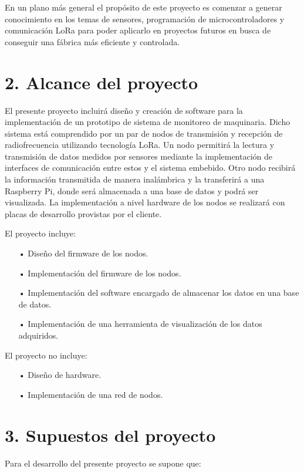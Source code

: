 \documentclass[11pt]{charter}
\begin{document}
En un plano más general el propósito de este proyecto es comenzar a generar conocimiento en los temas de sensores, programación de microcontroladores y comunicación LoRa para poder aplicarlo en proyectos futuros en busca de conseguir una fábrica más eficiente y controlada.

\section{2. Alcance del proyecto}
\label{sec:alcance}

El presente proyecto incluirá diseño y creación de software para la implementación de un prototipo de sistema de monitoreo de maquinaria. Dicho sistema está comprendido por un par de nodos de transmisión y recepción de radiofrecuencia utilizando tecnología LoRa. Un nodo permitirá la lectura y transmisión de datos medidos por sensores mediante la implementación de interfaces de comunicación entre estos y el sistema embebido. Otro nodo recibirá la información transmitida de manera inalámbrica y la transferirá a una Raspberry Pi, donde será almacenada a una base de datos y podrá ser visualizada. La implementación a nivel hardware de los nodos se realizará con placas de desarrollo provistas por el cliente.

El proyecto incluye:
\begin{itemize}
\item[•] Diseño del firmware de los nodos.
\item[•] Implementación del firmware de los nodos.
\item[•] Implementación del software encargado de almacenar los datos en una base de datos.
\item[•] Implementación de una herramienta de visualización de los datos adquiridos.
\end{itemize}

El proyecto no incluye:
\begin{itemize}
\item[•] Diseño de hardware.
\item[•] Implementación de una red de nodos.
\end{itemize}


\section{3. Supuestos del proyecto}
\label{sec:supuestos}

Para el desarrollo del presente proyecto se supone que:
\end{document}
